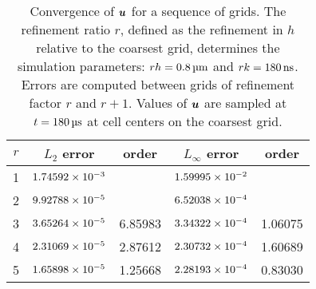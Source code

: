 \begin{table}[tbp]
    \centering
    \caption[Convergence of fluid velocities for relaxing RBC test]{%
Convergence of $\boldsymbol{u}$ for a sequence of grids. The refinement ratio $r$, defined as the
refinement in $h$ relative to the coarsest grid, determines the simulation parameters:
$rh = 0.8\um$ and $r\timestep = 180\ns$. Errors are computed between grids of refinement
factor $r$ and $r+1$. Values of $\boldsymbol{u}$ are sampled at $t = 180\us$ at cell centers on the
coarsest grid.
    }\label{tab:u-rbc-conv}
    \begingroup
    \setlength{\tabcolsep}{9pt}
    \renewcommand{\arraystretch}{1.5}
    \begin{tabular}{c|cc|cc}
                                                                                     \toprule
        $r$ & $L_2$ error            & order   & $L_\infty$ error       & order   \\ \midrule
        1   & ${1.74592}\times 10^{-3}$ &         & ${1.59995}\times 10^{-2}$ &         \\
        2   & ${9.92788}\times 10^{-5}$ &         & ${6.52038}\times 10^{-4}$ &         \\
        3   & ${3.65264}\times 10^{-5}$ & 6.85983 & ${3.34322}\times 10^{-4}$ & 1.06075 \\
        4   & ${2.31069}\times 10^{-5}$ & 2.87612 & ${2.30732}\times 10^{-4}$ & 1.60689 \\
        5   & ${1.65898}\times 10^{-5}$ & 1.25668 & ${2.28193}\times 10^{-4}$ & 0.83030 \\ \bottomrule
    \end{tabular}
    \endgroup
\end{table}


